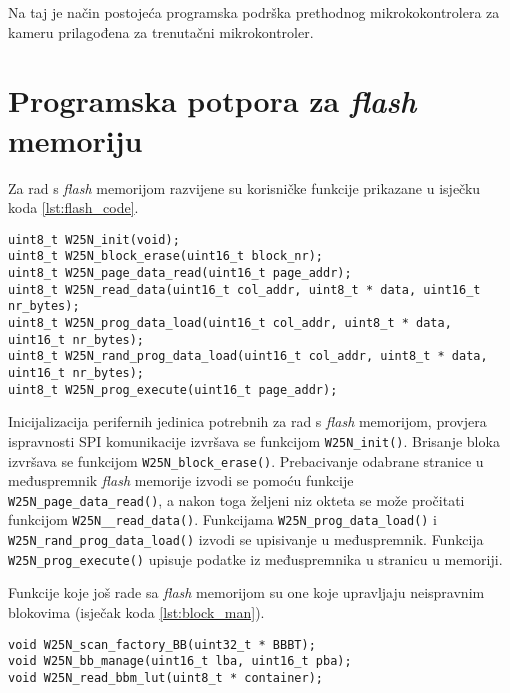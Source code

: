 Na taj je način postojeća programska podrška prethodnog mikrokokontrolera za kameru prilagođena za trenutačni mikrokontroler.

\section{Programska potpora za \textit{flash} memoriju}


Za rad s \textit{flash} memorijom razvijene su korisničke funkcije prikazane u isječku koda \ref{lst:flash_code}.

\begin{lstlisting}[caption=Korisničke funkcije za \textit{flash} memoriju, label={lst:flash_code}]
uint8_t W25N_init(void);
uint8_t W25N_block_erase(uint16_t block_nr);
uint8_t W25N_page_data_read(uint16_t page_addr);
uint8_t W25N_read_data(uint16_t col_addr, uint8_t * data, uint16_t nr_bytes);
uint8_t W25N_prog_data_load(uint16_t col_addr, uint8_t * data, uint16_t nr_bytes);
uint8_t W25N_rand_prog_data_load(uint16_t col_addr, uint8_t * data, uint16_t nr_bytes);
uint8_t W25N_prog_execute(uint16_t page_addr);
\end{lstlisting}

\noindent Inicijalizacija perifernih jedinica potrebnih za rad s \textit{flash} memorijom, provjera ispravnosti SPI komunikacije izvršava se funkcijom \verb|W25N_init()|. Brisanje bloka izvršava se funkcijom \verb|W25N_block_erase()|. Prebacivanje odabrane stranice u međuspremnik \textit{flash} memorije izvodi se pomoću funkcije \verb|W25N_page_data_read()|, a nakon toga željeni niz okteta se može pročitati funkcijom \verb|W25N__read_data()|. Funkcijama \verb|W25N_prog_data_load()| i \verb|W25N_rand_prog_data_load()| izvodi se upisivanje u međuspremnik. Funkcija \verb|W25N_prog_execute()| upisuje podatke iz međuspremnika u stranicu u memoriji.

Funkcije koje još rade sa \textit{flash} memorijom su one koje upravljaju neispravnim blokovima (isječak koda \ref{lst:block_man}).

\begin{lstlisting}[caption=Funkcije za upravljanje neispravnim blokovima, label={lst:block_man}]
void W25N_scan_factory_BB(uint32_t * BBBT);
void W25N_bb_manage(uint16_t lba, uint16_t pba);
void W25N_read_bbm_lut(uint8_t * container);
\end{lstlisting}

